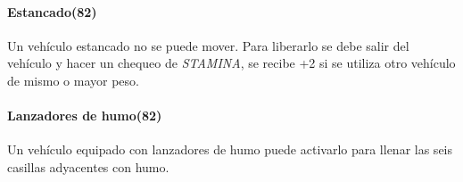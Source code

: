         \paragraph{Estancado(82)}
        Un vehículo estancado no se puede mover. Para liberarlo se debe salir del vehículo y hacer un chequeo de \emph{STAMINA}, se recibe +2 si se utiliza otro vehículo de mismo o mayor peso.

        \paragraph{Lanzadores de humo(82)}
        Un vehículo equipado con lanzadores de humo puede activarlo para llenar las seis casillas adyacentes con humo.
